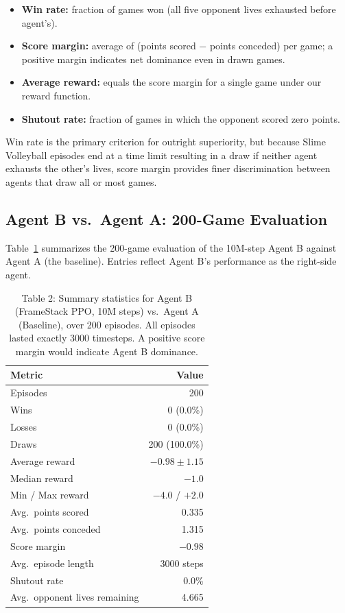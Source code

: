 \documentclass[conference]{IEEEtran}
\begin{document}
\begin{itemize}
    \item \textbf{Win rate:} fraction of games won (all five opponent lives exhausted before agent's).
    \item \textbf{Score margin:} average of (points scored $-$ points conceded) per game; a positive margin indicates net dominance even in drawn games.
    \item \textbf{Average reward:} equals the score margin for a single game under our reward function.
    \item \textbf{Shutout rate:} fraction of games in which the opponent scored zero points.
\end{itemize}

Win rate is the primary criterion for outright superiority, but because Slime Volleyball episodes end at a time limit resulting in a draw if neither agent exhausts the other's lives, score margin provides finer discrimination between agents that draw all or most games.

\subsection{Agent B vs.\ Agent A: 200-Game Evaluation}

Table~\ref{tab:results} summarizes the 200-game evaluation of the 10M-step Agent B against Agent A (the baseline). Entries reflect Agent B's performance as the right-side agent.

\begin{table}[h]
\caption{Table 2: Summary statistics for Agent B (FrameStack PPO, 10M steps) vs.\ Agent A (Baseline), over 200 episodes. All episodes lasted exactly 3000 timesteps. A positive score margin would indicate Agent B dominance.}
\label{tab:results}
\begin{center}
\begin{tabular}{|l|r|}
\hline
\textbf{Metric} & \textbf{Value} \\
\hline
Episodes & 200 \\
\hline
Wins & 0 (0.0\%) \\
\hline
Losses & 0 (0.0\%) \\
\hline
Draws & 200 (100.0\%) \\
\hline
Average reward & $-0.98 \pm 1.15$ \\
\hline
Median reward & $-1.0$ \\
\hline
Min / Max reward & $-4.0$ / $+2.0$ \\
\hline
Avg.\ points scored & 0.335 \\
\hline
Avg.\ points conceded & 1.315 \\
\hline
Score margin & $-0.98$ \\
\hline
Avg.\ episode length & 3000 steps \\
\hline
Shutout rate & 0.0\% \\
\hline
Avg.\ opponent lives remaining & 4.665 \\
\hline
\end{tabular}
\end{center}
\end{table}
\end{document}

